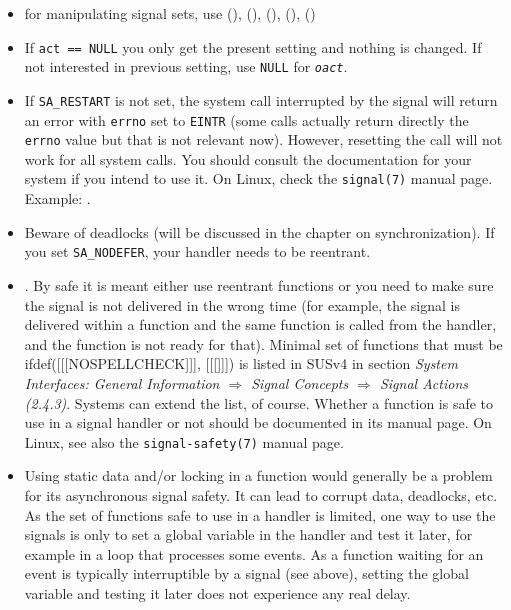 \begin{itemize}
\item for manipulating signal sets, use (),
(), (), (),
()
\item If \texttt{act == NULL} you only get the present setting and nothing is
changed.  If not interested in previous setting, use \texttt{NULL} for
\emph{\texttt{oact}}.
\item If \texttt{SA\_RESTART} is not set, the system call interrupted by the
signal will return an error with \texttt{errno} set to \texttt{EINTR} (some
calls actually return directly the \texttt{errno} value but that is not relevant
now).  However, resetting the call will not work for all system calls.  You
should consult the documentation for your system if you intend to use it.
On Linux, check the \texttt{signal(7)} manual page.  Example:
.
\item Beware of deadlocks (will be discussed in the chapter on synchronization).
If you set \texttt{SA\_NODEFER}, your handler needs to be reentrant.
\item \label{ASYNCSIGNALSAFE} .  By safe it is meant either use reentrant functions or you need
to make sure the signal is not delivered in the wrong time (for example, the
signal is delivered within a function and the same function is called from the
handler, and the function is not ready for that).  Minimal set of functions
that must be ifdef([[[NOSPELLCHECK]]], [[[]]])
is listed in SUSv4 in section \emph{System Interfaces: General Information
$\Rightarrow$ Signal Concepts $\Rightarrow$ Signal Actions (2.4.3)}.  Systems
can extend the list, of course.  Whether a function is safe to use in a signal
handler or not should be documented in its manual page.  On Linux, see also
the \texttt{signal-safety(7)} manual page.
\item Using static data and/or locking in a function would generally be a
problem for its asynchronous signal safety.  It can lead to corrupt data,
deadlocks, etc.  As the set of functions safe to use in a handler is limited,
one way to use the signals is only to set a global variable in the handler and
test it later, for example in a loop that processes some events.  As a function
waiting for an event is typically interruptible by a signal (see above), setting
the global variable and testing it later does not experience any real delay.

\end{itemize}
